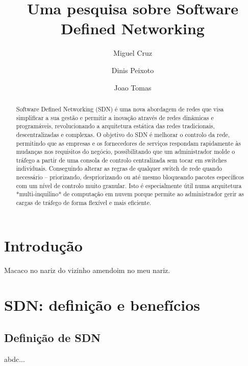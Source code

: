 \documentclass{llncs}
\begin{document}
\mainmatter
\title{Uma pesquisa sobre Software Defined Networking}


\author{Miguel Cruz \and Dinis Peixoto \and Joao Tomas}



\date{}


\maketitle
\begin{abstract}
    Software Defined Networking (SDN) é uma nova abordagem de redes que visa simplificar a sua gestão e permitir a inovação através de redes dinâmicas e programáveis,  revolucionando a arquitetura estática das redes tradicionais, descentralizadas e complexas. 
    O objetivo do SDN é melhorar o controlo da rede, permitindo que as empresas e os fornecedores de serviços respondam rapidamente às mudanças nos requisitos do negócio, possibilitando que um administrador molde o tráfego a partir de uma consola de controlo centralizada sem tocar em switches individuais. Conseguindo alterar as regras de qualquer switch de rede quando necessário – priorizando, despriorizando ou até mesmo bloqueando pacotes específicos com um nível de controlo muito granular.
    Isto é especialmente útil numa arquitetura *multi-inquilino* de computação em nuvem porque permite ao administrador gerir as cargas de tráfego de forma flexível e mais eficiente.
\end{abstract}

\section{Introdução}

Macaco no nariz do vizinho amendoim no meu nariz. \cite{Zadeh65}

\section{SDN: definição e benefícios}

\subsection{Definição de SDN}
abdc...
\end{document}
